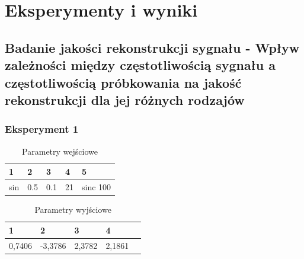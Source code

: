 \documentclass[12pt]{article}
\begin{document}
    \section{Eksperymenty i wyniki} {

        \subsection{Badanie jakości rekonstrukcji sygnału - Wpływ zależności między częstotliwością
        sygnału a częstotliwością próbkowania na jakość rekonstrukcji dla jej różnych rodzajów} {

            \subsubsection{Eksperyment 1} {
                \begin{table}[H]
                    \centering
                    \begin{tabular}{|l|l|l|l|l|}
                        \hline
                        1 & 2 & 3 & 4 & 5   \\ \hline
                        sin & 0.5 & 0.1 & 21 & sinc 100    \\ \hline
                    \end{tabular}
                    \caption{Parametry wejściowe}
                \end{table}

                \begin{table}[H]
                    \centering
                    \begin{tabular}{|l|l|l|l|l|}
                        \hline
                        1 & 2 & 3 & 4   \\ \hline
                        0,7406 & -3,3786 & 2,3782 & 2,1861 \\ \hline
                    \end{tabular}
                    \caption{Parametry wyjściowe}
                \end{table}


}}}
\end{document}
